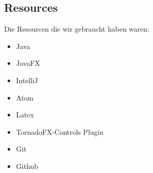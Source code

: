 \subsection{Resources}
Die Resourcen die wir gebraucht haben waren:
\begin{itemize}
  \item Java
  \item JavaFX
  \item IntelliJ
  \item Atom
  \item Latex
  \item TornadoFX-Controls Plugin
  \item Git
  \item Github

\end{itemize}
